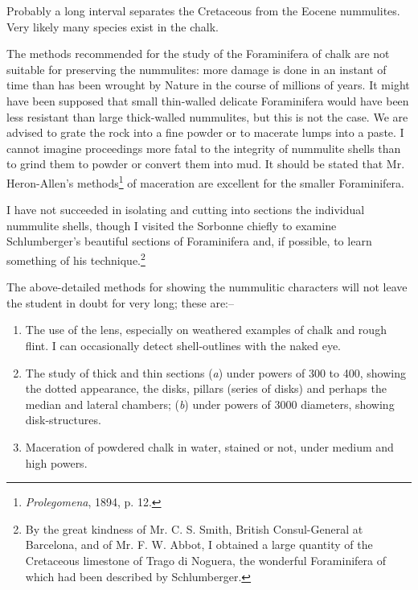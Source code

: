 \documentclass[a4paper, 12pt, oneside]{article}
\begin{document}
Probably a long interval separates the Cretaceous from the Eocene nummulites. Very likely many species exist in the chalk.

The methods recommended for the study of the Foraminifera of chalk are not suitable for preserving the nummulites: more damage is done in an instant of time than has been wrought by Nature in the course of millions of years. It might have been supposed that small thin-walled delicate Foraminifera would have been less resistant than large thick-walled nummulites, but this is not the case. We are advised to grate the rock into a fine powder or to macerate lumps into a paste. I cannot imagine proceedings more fatal to the integrity of nummulite shells than to grind them to powder or convert them into mud. It should be stated that Mr. Heron-Allen's methods\footnote{\emph{Prolegomena}, 1894, p. 12.} of maceration are excellent for the smaller Foraminifera.

I have not succeeded in isolating and cutting into sections the individual nummulite shells, though I visited the Sorbonne chiefly to examine Schlumberger's beautiful sections of Foraminifera and, if possible, to learn something of his technique.\footnote{By the great kindness of Mr. C. S. Smith, British Consul-General at Barcelona, and of Mr. F. W. Abbot, I obtained a large quantity of the Cretaceous limestone of Trago di Noguera, the wonderful Foraminifera of which had been described by Schlumberger.}

The above-detailed methods for showing the nummulitic characters will not leave the student in doubt for very long; these are:--
\begin{enumerate}
\item The use of the lens, especially on weathered examples of chalk and rough flint. I can occasionally detect shell-outlines with the naked eye.

\item The study of thick and thin sections (\emph{a}) under powers of 300 to 400, showing the dotted appearance, the disks, pillars (series of disks) and perhaps the median and lateral chambers; (\emph{b}) under powers of 3000 diameters, showing disk-structures.

\item Maceration of powdered chalk in water, stained or not, under medium and high powers.
\end{enumerate}
\end{document}
